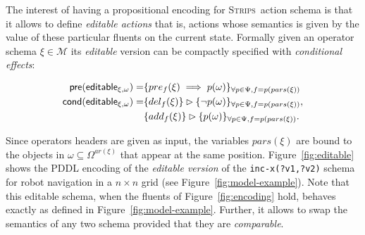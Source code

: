 \documentclass[letterpaper]{article} %
\newcommand{\pre}{\mathsf{pre}}     %
\newcommand{\cond}{\mathsf{cond}}   %
\newcommand{\strips}{\textsc{Strips}}     %
\begin{document}
The interest of having a propositional encoding for \strips\ action schema is that it allows to define {\em editable actions} that is, actions whose semantics is given by the value of these particular fluents on the current state. Formally given an operator schema $\xi\in\mathcal{M}$ its {\em editable} version can be compactly specified with {\em conditional effects}:
\begin{small}
\begin{align*}
\hspace*{7pt}\pre(\mathsf{editable_{\xi,\omega}})=&\{pre_{f}(\xi)\implies p(\omega)\}_{\forall p\in\Psi,f=p(pars(\xi))}\\
\cond(\mathsf{editable_{\xi,\omega}})=&\{del_{f}(\xi)\}\rhd\{\neg p(\omega)\}_{\forall p\in\Psi,f=p(pars(\xi))},\\
&\{add_{f}(\xi)\}\rhd\{p(\omega)\}_{\forall p\in\Psi,f=p(pars(\xi))}.
\end{align*}
\end{small}
Since operators headers are given as input, the variables $pars(\xi)$ are bound to the objects in $\omega\subseteq\Omega^{ar(\xi)}$ that appear at the same position. Figure~\ref{fig:editable} shows the PDDL encoding of the {\em editable version} of the {\tt\small inc-x(?v1,?v2)} schema for robot navigation in a $n\times n$ grid (see Figure~\ref{fig:model-example}). Note that this editable schema, when the fluents of Figure~\ref{fig:encoding} hold, behaves exactly as defined in Figure~\ref{fig:model-example}. Further, it allows to swap the semantics of any two schema provided that they are {\em comparable}. 
\end{document}

